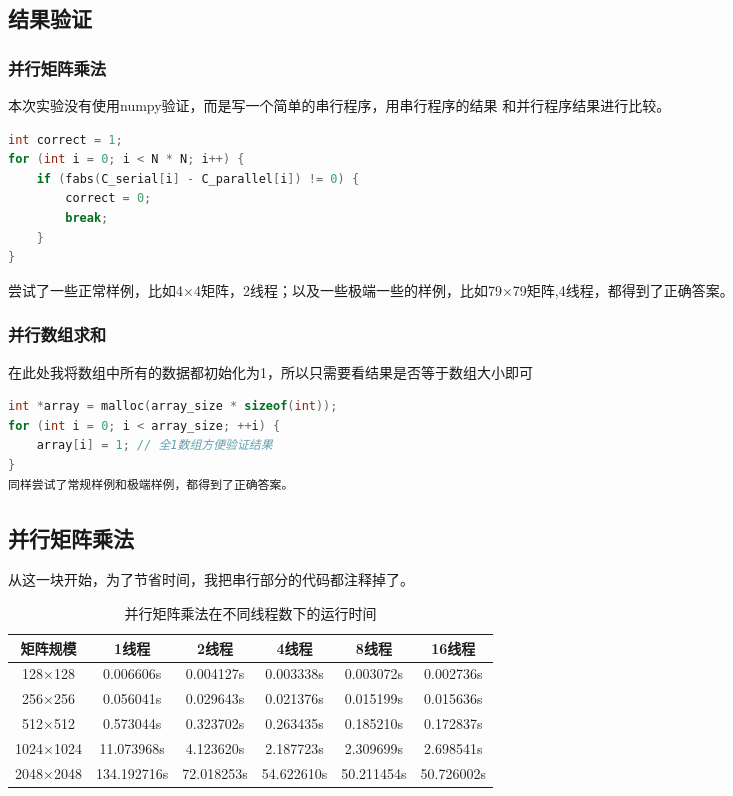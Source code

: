 \documentclass{SYSUReport}
\begin{document}
\subsection{结果验证}

\subsubsection{并行矩阵乘法}
本次实验没有使用numpy验证，而是写一个简单的串行程序，用串行程序的结果
和并行程序结果进行比较。

\begin{lstlisting}[language=c]
int correct = 1;
for (int i = 0; i < N * N; i++) {
    if (fabs(C_serial[i] - C_parallel[i]) != 0) {
        correct = 0;
        break;
    }
}
\end{lstlisting}
尝试了一些正常样例，比如4×4矩阵，2线程；以及一些极端一些的样例，比如79×79矩阵,4线程，都得到了正确答案。
\subsubsection{并行数组求和}
在此处我将数组中所有的数据都初始化为1，所以只需要看结果是否等于数组大小即可
\begin{lstlisting}[language=c]
int *array = malloc(array_size * sizeof(int));
for (int i = 0; i < array_size; ++i) {
    array[i] = 1; // 全1数组方便验证结果
}
同样尝试了常规样例和极端样例，都得到了正确答案。
\end{lstlisting}
\subsection{并行矩阵乘法}

    \begin{table}[H]
\centering
\caption{并行矩阵乘法在不同线程数下的运行时间}
从这一块开始，为了节省时间，我把串行部分的代码都注释掉了。
\begin{tabular}{cccccc}
\toprule
矩阵规模 & 1线程 & 2线程 & 4线程 & 8线程 & 16线程 \\
\midrule
128×128 &0.006606s &0.004127s &0.003338s &0.003072s &0.002736s \\
256×256 &0.056041s &0.029643s &0.021376s &0.015199s &0.015636s \\
512×512 &0.573044s &0.323702s &0.263435s &0.185210s &0.172837s \\
1024×1024 &11.073968s &4.123620s &2.187723s &2.309699s &2.698541s \\
2048×2048 &134.192716s &72.018253s &54.622610s &50.211454s &50.726002s \\
\bottomrule
\end{tabular}
\end{table}
\end{document}
